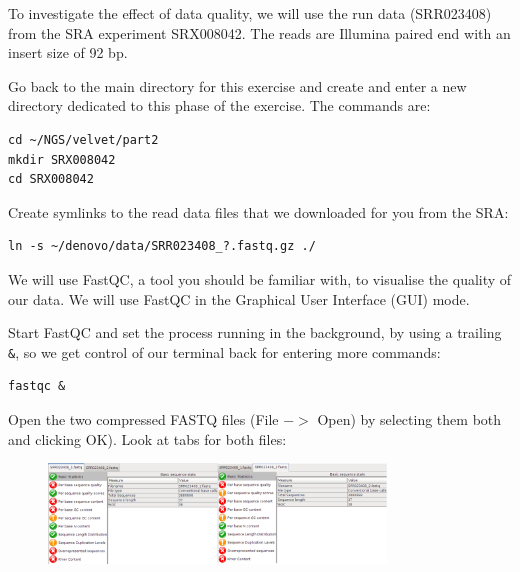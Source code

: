 \begin{information}
To investigate the effect of data quality, we will use the run data (SRR023408)
from the SRA experiment SRX008042. The reads are Illumina paired end with an
insert size of 92 bp.
\end{information}

\begin{steps}
Go back to the main directory for this exercise and create and enter a new
directory dedicated to this phase of the exercise. The commands are:
\begin{lstlisting}
cd ~/NGS/velvet/part2 
mkdir SRX008042 
cd SRX008042
\end{lstlisting}

Create symlinks to the read data files that we downloaded for you from the SRA:
\begin{lstlisting}
ln -s ~/denovo/data/SRR023408_?.fastq.gz ./
\end{lstlisting}
\end{steps}

\begin{note}
We will use FastQC, a tool you should be familiar with, to visualise the quality
of our data. We will use FastQC in the Graphical User Interface (GUI) mode.
\end{note}

\begin{steps}
Start FastQC and set the process running in the background, by using a trailing
\texttt{\&}, so we get control of our terminal back for entering more commands:
\begin{lstlisting}
fastqc &
\end{lstlisting}
\end{steps}

\begin{steps}
Open the two compressed FASTQ files (File $->$ Open) by selecting them both and clicking OK).
Look at tabs for both files:
\end{steps}

\begin{figure}[H]
\centering
\includegraphics[width=0.8\textwidth]{handout/velvet/paired_fastqc.png}
\caption{\label{fig:paired_fastqc}}
\end{figure}

